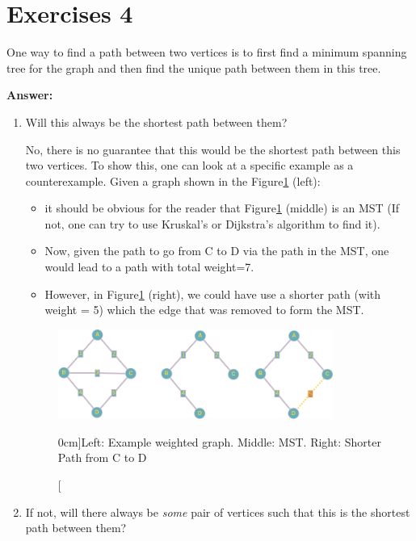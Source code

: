 \documentclass[nobib]{tufte-handout}
\newcounter{counter}
\begin{document}
\section{Exercises 4}

  One way to find a path between two vertices is to first find a minimum spanning tree for the graph and then find the unique path between them in this tree.  

\textbf{Answer:} \\ 
\begin{enumerate}
    \item Will this always be the shortest path between them?
    
    No, there is no guarantee that this would be the shortest path between this two vertices. To show this, one can look at a specific example as a counterexample. Given a graph shown in the Figure\ref{fig:ex4_full} (left):
    \begin{itemize}
        \item it should be obvious for the reader that Figure\ref{fig:ex4_full} (middle) is an MST (If not, one can try to use Kruskal's or Dijkstra's algorithm to find it).
        \item Now, given the path to go from C to D via the path in the MST, one would lead to a path with total weight=7.
        \item However, in Figure\ref{fig:ex4_full} (right), we could have use a shorter path (with weight = 5) which the edge that was removed to form the MST.  
    \end{itemize}  
    
\begin{figure}
  \centering
  \includegraphics[width=0.85\textwidth]{graphics/L6_prim_kruskal_dijkstra/ex4_full.png}
  \caption[][0cm]{Left: Example weighted graph. Middle: MST. Right: Shorter Path from C to D}
  \label{fig:ex4_full}
\end{figure}

    \item If not, will there always be \emph{some} pair of vertices such that this is the shortest path between them?
    

\end{enumerate}
\end{document}
